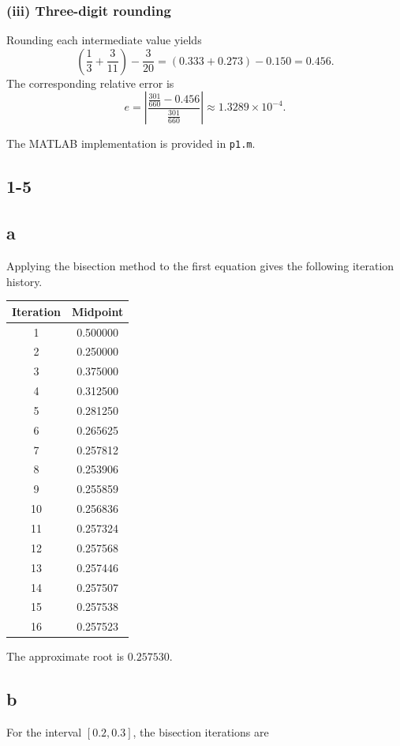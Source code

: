 \documentclass[11pt,a4paper]{report}
\theoremstyle{remark}
\begin{document}
\subsubsection*{(iii) Three-digit rounding}
Rounding each intermediate value yields
\[
\left(\frac{1}{3}+\frac{3}{11}\right)-\frac{3}{20}
=(0.333+0.273)-0.150=0.456.
\]
The corresponding relative error is
\[
e=\left|\frac{\frac{301}{660}-0.456}{\frac{301}{660}}\right|
  \approx 1.3289\times 10^{-4}.
\]

The MATLAB implementation is provided in \texttt{p1.m}.

\subsection*{1-5}
\subsection*{a}
Applying the bisection method to the first equation gives the following iteration history.
\begin{table}[htbp]
\centering
\begin{tabular}{cc}
\hline
Iteration & Midpoint\\
\hline
1 & 0.500000\\
2 & 0.250000\\
3 & 0.375000\\
4 & 0.312500\\
5 & 0.281250\\
6 & 0.265625\\
7 & 0.257812\\
8 & 0.253906\\
9 & 0.255859\\
10 & 0.256836\\
11 & 0.257324\\
12 & 0.257568\\
13 & 0.257446\\
14 & 0.257507\\
15 & 0.257538\\
16 & 0.257523\\
\hline
\end{tabular}
\end{table}

The approximate root is $0.257530$.

\subsection*{b}
For the interval $[0.2,0.3]$, the bisection iterations are
\end{document}
